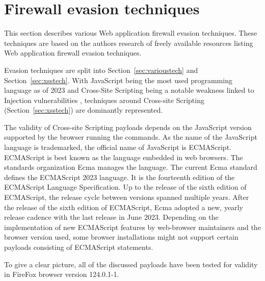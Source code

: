 \section{Firewall evasion techniques}
\label{sec:firewallevasiontechniques}

This section describes various Web application firewall evasion techniques. These techniques are based on the authors research of freely available resources listing Web application firewall evasion techniques.

Evasion techniques are split into Section~\ref{sec:varioustech} and Section~\ref{sec:xsstech}. With JavaScript being the most used programming language as of 2023 \cite{statista/mostusedlang} and Cross-Site Scripting being a notable weakness linked to Injection vulnerabilities \cite{OWASP/Injection21}, techniques around Cross-site Scripting (Section~\ref{sec:xsstech}) are dominantly represented.

The validity of Cross-site Scripting payloads depends on the JavaScript version supported by the browser running the commands. As the name of the JavaScript language is trademarked, the official name of JavaScript is ECMAScript. ECMAScript is best known as the language embedded in web browsers. The standards organization Ecma manages the language. The current Ecma standard defines the ECMAScript 2023 language. It is the fourteenth edition of the ECMAScript Language Specification. Up to the release of the sixth edition of ECMAScript, the release cycle between versions spanned multiple years. After the release of the sixth edition of ECMAScript, Ecma adopted a new, yearly release cadence with the last release in June 2023. \cite{ecma/release,ecma/intro,explorejs/ecmascript}
Depending on the implementation of new ECMAScript features by web-browser maintainers and the browser version used, some browser installations might not support certain payloads consisting of ECMAScript statements. \cite{kangax/compattable}

To give a clear picture, all of the discussed payloads have been tested for validity in FireFox browser version 124.0.1-1.

